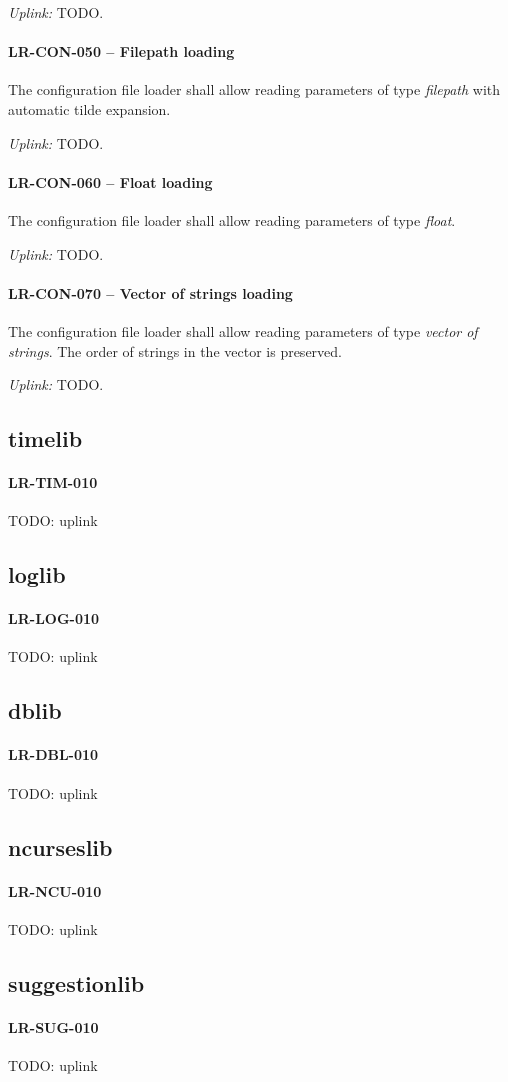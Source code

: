 \textit{Uplink: } TODO.

\paragraph{LR-CON-050 -- Filepath loading}
The configuration file loader shall allow reading parameters of type
\emph{filepath} with automatic tilde expansion.

\textit{Uplink: } TODO.

\paragraph{LR-CON-060 -- Float loading}
The configuration file loader shall allow reading parameters of type
\emph{float}.

\textit{Uplink: } TODO.

\paragraph{LR-CON-070 -- Vector of strings loading}
The configuration file loader shall allow reading parameters of type
\emph{vector of strings}. The order of strings in the vector is preserved.

\textit{Uplink: } TODO.

\subsection{time\textunderscore lib}
\paragraph{LR-TIM-010}
TODO: uplink

\subsection{log\textunderscore lib}
\paragraph{LR-LOG-010}
TODO: uplink

\subsection{db\textunderscore lib}
\paragraph{LR-DBL-010}
TODO: uplink

\subsection{ncurses\textunderscore lib}
\paragraph{LR-NCU-010}
TODO: uplink

\subsection{suggestion\textunderscore lib}
\paragraph{LR-SUG-010}
TODO: uplink
